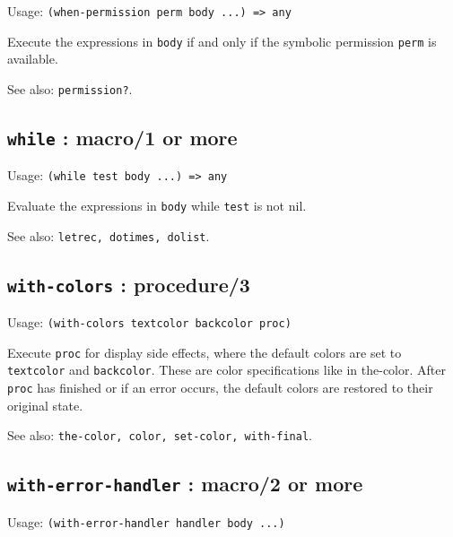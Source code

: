 \documentclass[
]{article}
\newcommand{\passthrough}[1]{#1}
\begin{document}
Usage: \passthrough{\lstinline!(when-permission perm body ...) => any!}

Execute the expressions in \passthrough{\lstinline!body!} if and only if
the symbolic permission \passthrough{\lstinline!perm!} is available.

See also: \passthrough{\lstinline!permission?!}.

\hypertarget{while-macro1-or-more-1}{%
\subsection{\texorpdfstring{\texttt{while} : macro/1 or
more}{while : macro/1 or more}}\label{while-macro1-or-more-1}}

Usage: \passthrough{\lstinline!(while test body ...) => any!}

Evaluate the expressions in \passthrough{\lstinline!body!} while
\passthrough{\lstinline!test!} is not nil.

See also: \passthrough{\lstinline!letrec, dotimes, dolist!}.

\hypertarget{with-colors-procedure3-1}{%
\subsection{\texorpdfstring{\texttt{with-colors} :
procedure/3}{with-colors : procedure/3}}\label{with-colors-procedure3-1}}

Usage: \passthrough{\lstinline!(with-colors textcolor backcolor proc)!}

Execute \passthrough{\lstinline!proc!} for display side effects, where
the default colors are set to \passthrough{\lstinline!textcolor!} and
\passthrough{\lstinline!backcolor!}. These are color specifications like
in the-color. After \passthrough{\lstinline!proc!} has finished or if an
error occurs, the default colors are restored to their original state.

See also:
\passthrough{\lstinline!the-color, color, set-color, with-final!}.

\hypertarget{with-error-handler-macro2-or-more-1}{%
\subsection{\texorpdfstring{\texttt{with-error-handler} : macro/2 or
more}{with-error-handler : macro/2 or more}}\label{with-error-handler-macro2-or-more-1}}

Usage: \passthrough{\lstinline!(with-error-handler handler body ...)!}
\end{document}
